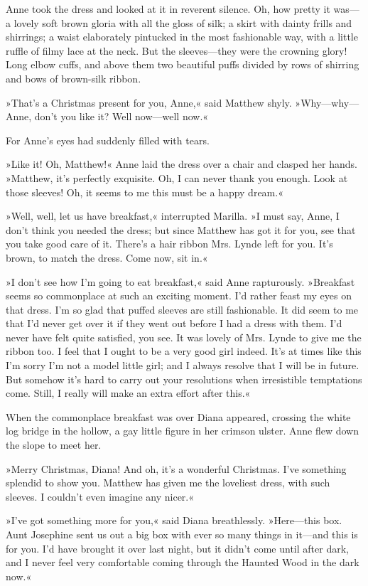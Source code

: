 Anne took the dress and looked at it in reverent silence. Oh, how pretty it was—a lovely soft brown gloria with all the gloss of silk; a skirt with dainty frills and shirrings; a waist elaborately pintucked in the most fashionable way, with a little ruffle of filmy lace at the neck. But the sleeves—they were the crowning glory! Long elbow cuffs, and above them two beautiful puffs divided by rows of shirring and bows of brown-silk ribbon.

»That’s a Christmas present for you, Anne,« said Matthew shyly. »Why—why—Anne, don’t you like it? Well now—well now.«

For Anne’s eyes had suddenly filled with tears.

»Like it! Oh, Matthew!« Anne laid the dress over a chair and clasped her hands. »Matthew, it’s perfectly exquisite. Oh, I can never thank you enough. Look at those sleeves! Oh, it seems to me this must be a happy dream.«

»Well, well, let us have breakfast,« interrupted Marilla. »I must say, Anne, I don’t think you needed the dress; but since Matthew has got it for you, see that you take good care of it. There’s a hair ribbon Mrs. Lynde left for you. It’s brown, to match the dress. Come now, sit in.«

»I don’t see how I’m going to eat breakfast,« said Anne rapturously. »Breakfast seems so commonplace at such an exciting moment. I’d rather feast my eyes on that dress. I’m so glad that puffed sleeves are still fashionable. It did seem to me that I’d never get over it if they went out before I had a dress with them. I’d never have felt quite satisfied, you see. It was lovely of Mrs. Lynde to give me the ribbon too. I feel that I ought to be a very good girl indeed. It’s at times like this I’m sorry I’m not a model little girl; and I always resolve that I will be in future. But somehow it’s hard to carry out your resolutions when irresistible temptations come. Still, I really will make an extra effort after this.«

When the commonplace breakfast was over Diana appeared, crossing the white log bridge in the hollow, a gay little figure in her crimson ulster. Anne flew down the slope to meet her.

»Merry Christmas, Diana! And oh, it’s a wonderful Christmas. I’ve something splendid to show you. Matthew has given me the loveliest dress, with such sleeves. I couldn’t even imagine any nicer.«

»I’ve got something more for you,« said Diana breathlessly. »Here—this box. Aunt Josephine sent us out a big box with ever so many things in it—and this is for you. I’d have brought it over last night, but it didn’t come until after dark, and I never feel very comfortable coming through the Haunted Wood in the dark now.«

